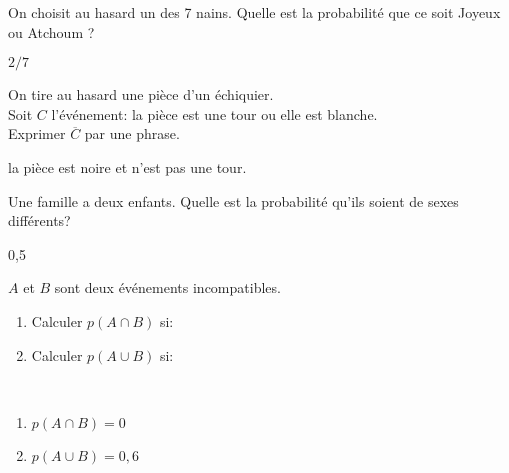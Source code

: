 \begin{exercice*}
 On choisit au hasard un des 7 nains. 
 Quelle est la probabilité que ce soit Joyeux ou Atchoum ?
 \begin{corrige}
  $2/7$
 \end{corrige}
\end{exercice*}

\begin{exercice*}
 On tire au hasard une pièce d'un échiquier.\\ Soit $C$ l'événement: \og la pièce est une tour ou elle est blanche\fg .\\ 
 Exprimer $\overline{C}$ par une phrase.
 \begin{corrige}
  \og la pièce est noire et n'est pas une tour.
 \end{corrige}
\end{exercice*}

\begin{exercice*}
 Une famille a deux enfants. Quelle est la probabilité qu'ils soient de sexes différents?
 \begin{corrige}
  0,5
 \end{corrige}
\end{exercice*}

\begin{exercice*}
 $A$ et $B$ sont deux événements incompatibles.
 \begin{enumerate}
 \item  Calculer $p(A\cap B)$ si:
\item  Calculer $p(A\cup B)$ si:
\end{enumerate}
 \begin{corrige}
 ~\\
 \begin{enumerate}
 \item $p(A\cap B)=0$
 \item $p(A\cup B)=0,6$
 \end{enumerate}
   \end{corrige}
\end{exercice*}

